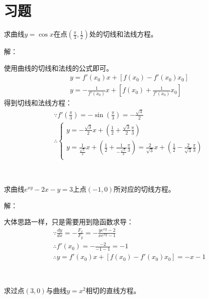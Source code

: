 \section{习题}

\begin{exercise}
求曲线$y=\cos x$在点$\left( \frac{\pi}{3},\frac{1}{2} \right) $处的切线和法线方程。
\end{exercise}

解：

使用曲线的切线和法线的公式即可。
\begin{align*}
&y=f'\left( x_0 \right) x+\left[ f\left( x_0 \right) -f'\left( x_0 \right) x_0 \right] \\
&y=-\frac{1}{f'\left( x_0 \right)}x+\left[ f\left( x_0 \right) +\frac{1}{f'\left( x_0 \right)}x_0 \right]
\end{align*}
得到切线和法线方程：
\begin{align*}
&\because f'\left( \frac{\pi}{3} \right) =-\sin \left( \frac{\pi}{3} \right) =-\frac{\sqrt{3}}{2} \\
&\therefore \begin{cases}
	y=-\frac{\sqrt{3}}{2}x+\left( \frac{1}{2}+\frac{\sqrt{3}}{2}\frac{\pi}{3} \right)\\
	y=\frac{1}{\frac{\sqrt{3}}{2}}x+\left( \frac{1}{2}+\frac{1}{-\frac{\sqrt{3}}{2}}\frac{\pi}{3} \right) =\frac{2}{\sqrt{3}}x+\left( \frac{1}{2}-\frac{2}{\sqrt{3}}\frac{\pi}{3} \right)\\
\end{cases}
\end{align*}

~

\begin{exercise}
求曲线$e^{xy}-2x-y=3$上点$\left( -1,0 \right) $所对应的切线方程。
\end{exercise}

解：

大体思路一样，只是需要用到隐函数求导：
\begin{align*}
&\because \frac{dy}{dx}=-\frac{F_x}{F_y}=-\frac{ye^{xy}-2}{xe^{xy}-1} \\
&\therefore f'\left( x_0 \right) =-\frac{-2}{-1-1}=-1 \\
&\therefore y=f'\left( x_0 \right) x+\left[ f\left( x_0 \right) -f'\left( x_0 \right) x_0 \right] =-x-1
\end{align*}

~

\begin{exercise}
求过点$\left( 3,0 \right) $与曲线$y=x^2$相切的直线方程。
\end{exercise}

